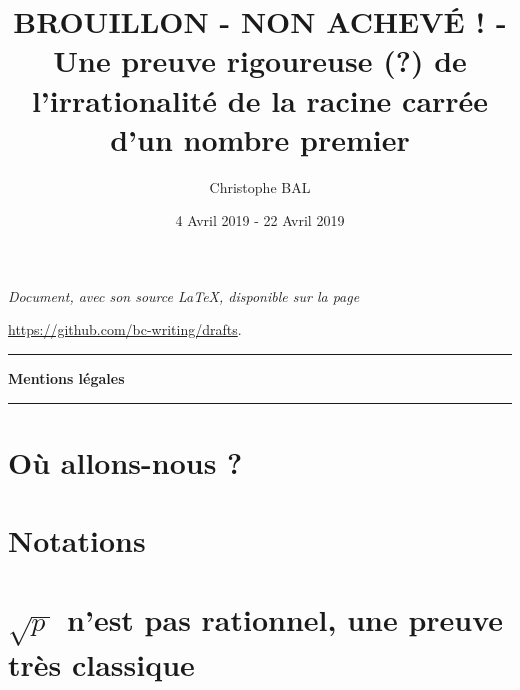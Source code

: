 \documentclass[12pt]{amsart}
\begin{document}
\title{BROUILLON - NON ACHEVÉ ! - Une preuve rigoureuse (\!?) de l'irrationalité de la racine carrée d'un nombre premier}
\author{Christophe BAL}
\date{4 Avril 2019 - 22 Avril 2019}

\maketitle

\begin{center}
	\itshape
	Document, avec son source \LaTeX, disponible sur la page

	\url{https://github.com/bc-writing/drafts}.
\end{center}


\bigskip


\begin{center}
	\hrule\vspace{.3em}
	{
		\fontsize{1.35em}{1em}\selectfont
		\textbf{Mentions \og légales \fg}
	}

	\vspace{0.45em}
	\doclicenseThis
	\hrule
\end{center}


\bigskip
\setcounter{tocdepth}{2}
\tableofcontents




\section{Où allons-nous ?}






\section{Notations}






\section{\texorpdfstring{$\sqrt{p\,}$ n'est pas rationnel, une preuve très classique}%
		                {Racine carrée de p n'est pas rationnel, une preuve très classique}}


\end{document}
